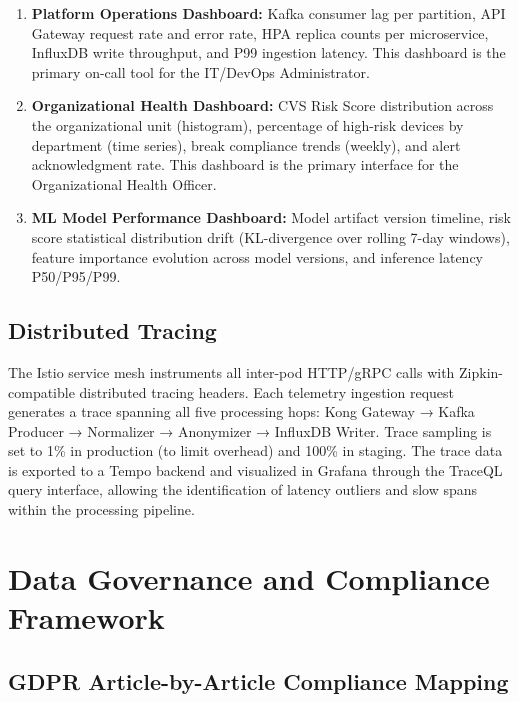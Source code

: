\documentclass[conference]{IEEEtran}
\begin{document}
\begin{enumerate}
  \item \textbf{Platform Operations Dashboard:} Kafka consumer lag per partition,
        API Gateway request rate and error rate, HPA replica counts per microservice,
        InfluxDB write throughput, and P99 ingestion latency. This dashboard is the
        primary on-call tool for the IT/DevOps Administrator.
  \item \textbf{Organizational Health Dashboard:} CVS Risk Score distribution across
        the organizational unit (histogram), percentage of high-risk devices by
        department (time series), break compliance trends (weekly), and alert
        acknowledgment rate. This dashboard is the primary interface for the
        Organizational Health Officer.
  \item \textbf{ML Model Performance Dashboard:} Model artifact version timeline,
        risk score statistical distribution drift (KL-divergence over rolling 7-day
        windows), feature importance evolution across model versions, and inference
        latency P50/P95/P99.
\end{enumerate}

\subsection{Distributed Tracing}

The Istio service mesh instruments all inter-pod HTTP/gRPC calls with Zipkin-compatible
distributed tracing headers. Each telemetry ingestion request generates a trace spanning
all five processing hops: Kong Gateway → Kafka Producer → Normalizer → Anonymizer →
InfluxDB Writer. Trace sampling is set to 1\% in production (to limit overhead) and
100\% in staging. The trace data is exported to a Tempo backend and visualized in Grafana
through the TraceQL query interface, allowing the identification of latency outliers
and slow spans within the processing pipeline.

\section{Data Governance and Compliance Framework}

\subsection{GDPR Article-by-Article Compliance Mapping}
\end{document}
